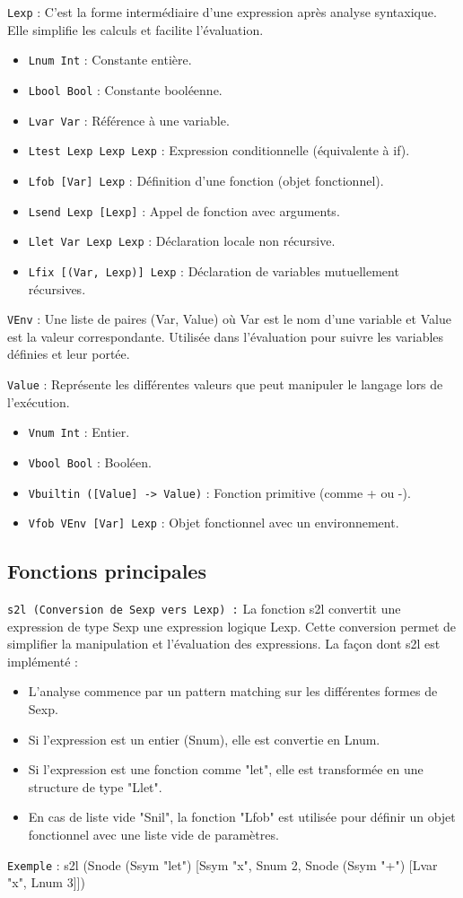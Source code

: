 \documentclass{article}
\begin{document}
\texttt{Lexp} : C’est la forme intermédiaire d’une expression après analyse syntaxique. Elle simplifie les calculs et facilite l'évaluation.
\begin{itemize}
    \item \texttt{Lnum Int} : Constante entière.
    \item \texttt{Lbool Bool} : Constante booléenne.
    \item \texttt{Lvar Var} : Référence à une variable.
    \item \texttt{Ltest Lexp Lexp Lexp} : Expression conditionnelle (équivalente à if).
    \item \texttt{Lfob [Var] Lexp} : Définition d'une fonction (objet fonctionnel).
    \item \texttt{Lsend Lexp [Lexp]} : Appel de fonction avec arguments.
    \item \texttt{Llet Var Lexp Lexp} : Déclaration locale non récursive.
    \item \texttt{Lfix [(Var, Lexp)] Lexp} : Déclaration de variables mutuellement récursives.
\end{itemize}

\texttt{VEnv} : Une liste de paires (Var, Value) où Var est le nom d’une variable et Value est la valeur correspondante. Utilisée dans l’évaluation pour suivre les variables définies et leur portée.

\texttt{Value} : Représente les différentes valeurs que peut manipuler le langage lors de l’exécution.
\begin{itemize}
    \item \texttt{Vnum Int} : Entier.
    \item \texttt{Vbool Bool} : Booléen.
    \item \texttt{Vbuiltin ([Value] -> Value)} : Fonction primitive (comme + ou -).
    \item \texttt{Vfob VEnv [Var] Lexp} : Objet fonctionnel avec un environnement.
\end{itemize}

\subsection{Fonctions principales}
\texttt{s2l (Conversion de Sexp vers Lexp) :} La fonction s2l convertit une expression de type Sexp une expression logique Lexp. Cette conversion permet de simplifier la manipulation et l’évaluation des expressions.
La façon dont s2l est implémenté :
\begin{itemize}
    \item L’analyse commence par un pattern matching sur les différentes formes de Sexp.
    \item Si l’expression est un entier (Snum), elle est convertie en Lnum.
    \item Si l’expression est une fonction comme "let", elle est transformée en une structure de type "Llet".
    \item En cas de liste vide "Snil", la fonction "Lfob" est utilisée pour définir un objet fonctionnel avec une liste vide de paramètres.
\end{itemize}
\texttt{Exemple} : s2l (Snode (Ssym "let") [Ssym "x", Snum 2, Snode (Ssym "+") [Lvar "x", Lnum 3]])
\end{document}
